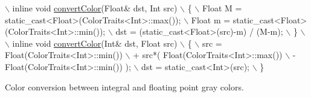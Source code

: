 \begin{DoxyCode}
\(\backslash\)
  inline \textcolor{keywordtype}{void} \hyperlink{group___color_conversion_gaf425c8b1868616a6840c61fe4a3e60c7}{convertColor}(Float& dst, Int src)                           \(\backslash\)
  \{                                                                       \(\backslash\)
    Float M = \textcolor{keyword}{static\_cast<}Float\textcolor{keyword}{>}(ColorTraits<Int>::max());                \(\backslash\)
    Float m = \textcolor{keyword}{static\_cast<}Float\textcolor{keyword}{>}(ColorTraits<Int>::min());                \(\backslash\)
    dst = (\textcolor{keyword}{static\_cast<}Float\textcolor{keyword}{>}(src)-m) / (M-m);                            \(\backslash\)
  \}                                                                       \(\backslash\)\(\backslash\)
  inline \textcolor{keywordtype}{void} \hyperlink{group___color_conversion_gaf425c8b1868616a6840c61fe4a3e60c7}{convertColor}(Int& dst, Float src)                           \(\backslash\)
  \{                                                                       \(\backslash\)
    src = Float(ColorTraits<Int>::min())                                  \(\backslash\)
      + src*( Float(ColorTraits<Int>::max())                              \(\backslash\)
          - Float(ColorTraits<Int>::min()) );                             \(\backslash\)
    dst = \textcolor{keyword}{static\_cast<}Int\textcolor{keyword}{>}(src);                                          \(\backslash\)
  \}
\end{DoxyCode}


Color conversion between integral and floating point gray colors. 

